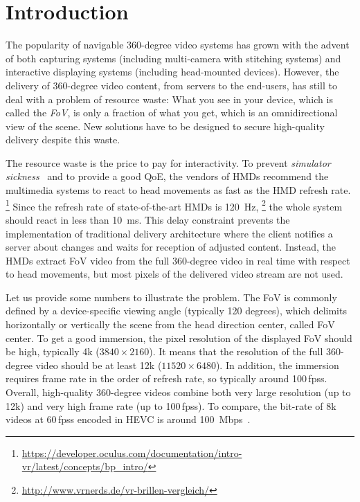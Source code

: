 \section{Introduction}
\label{sec:introduction}


The popularity of navigable 360-degree video systems
has grown with the advent of both capturing systems
(including multi-camera with stitching systems) and interactive displaying
systems (including head-mounted devices).
However, the delivery of 360-degree video content, from servers
to the end-users, has still to deal with a problem of resource waste: What you see in your device,
which is called the \textit{\ac{FoV}}, is only a fraction of what you get, which is an omnidirectional view of the scene.
New solutions have to be designed to secure high-quality delivery despite this waste.

The resource waste is the price to pay for interactivity.
To prevent \emph{simulator sickness}~\cite{moss2011characteristics}
and to provide a good \ac{QoE}, the vendors of \acp{HMD} recommend the multimedia
systems to react
to head movements as fast as the \ac{HMD}
refresh rate.%
\footnote{\url{https://developer.oculus.com/documentation/intro-vr/latest/concepts/bp_intro/}}
Since the refresh rate of
state-of-the-art \acp{HMD} is \SI{120}{Hz},%
\footnote{\url{http://www.vrnerds.de/vr-brillen-vergleich/}}
the whole system should react in less than
\SI{10}{ms}. This delay constraint prevents the implementation of traditional delivery
architecture where the client notifies a server about changes and waits for reception
of adjusted content. Instead, the \acp{HMD} extract \ac{FoV} video from the full
360-degree video in real time with respect to head movements, but most pixels
of the delivered video stream are not used.

Let us provide some numbers to illustrate the problem.
The \ac{FoV} is commonly defined by
a device-specific viewing angle (typically 120 degrees), which delimits horizontally or
vertically the scene from the head direction center, called \ac{FoV} center. To get a good
immersion, the pixel
resolution of
the displayed \ac{FoV} should be high, typically 4k ($3840\times2160$). It means that
the resolution of the full 360-degree video should be at least 12k ($11520\times6480$).
In addition, the immersion requires frame rate in the order of refresh rate, so
typically around 100\,\acp{fps}.
Overall, high-quality 360-degree videos combine both very large resolution (up to 12k)
and very high frame rate (up to 100\,\acp{fps}). To compare, the bit-rate of 8k videos
at 60\,\acp{fps} encoded in \ac{HEVC} is around \SI{100}{Mbps}~\cite{7398367}.



